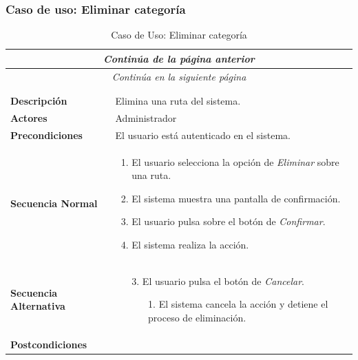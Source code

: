 


\newpage
\subsubsection*{Caso de uso: Eliminar categoría }
\begin{longtable}{| p{4cm} | p{10cm} |}
\endfirsthead
\multicolumn{2}{c}{\textit{Continúa de la página anterior}}\\[12pt]
\hline
\endhead
\hline
\multicolumn{2}{c}{\textit{Continúa en la siguiente página}} \\
\endfoot
\hline
\caption{Caso de Uso: Eliminar categoría}\label{fig:1}\\
\endlastfoot


\hline
\multicolumn{2}{|c|}{\textbf{CU$<$44$>$ - Eliminar Categoría}} \\

\hline
\textbf{Descripción} &
Elimina una ruta del sistema.\\

\hline
\textbf{Actores} &
Administrador\\

\hline
\textbf{Precondiciones} &
El usuario está autenticado en el sistema.\\

\hline
\textbf{Secuencia Normal} &\mbox{}\par\vspace{-\baselineskip}
\begin{enumerate}[leftmargin=0.7cm, topsep=0.1cm]
\item El usuario selecciona la opción de \textit{Eliminar} sobre una ruta.
\item El sistema muestra una pantalla de confirmación.
\item El usuario pulsa sobre el botón de \textit{Confirmar}.
\item El sistema realiza la acción.
\end{enumerate}


\\
\hline
\textbf{Secuencia Alternativa} &\mbox{}\par\vspace{-\baselineskip}
\begin{enumerate}[leftmargin=0.9cm, topsep=0.1cm]
\item[3.] El usuario pulsa el botón de \textit{Cancelar}.
	\begin{itemize}
	\item[1.] El sistema cancela la acción y detiene el proceso de eliminación.
	\end{itemize}
\end{enumerate}
\\

\hline
\textbf{Postcondiciones} & \\
\hline
\end{longtable}